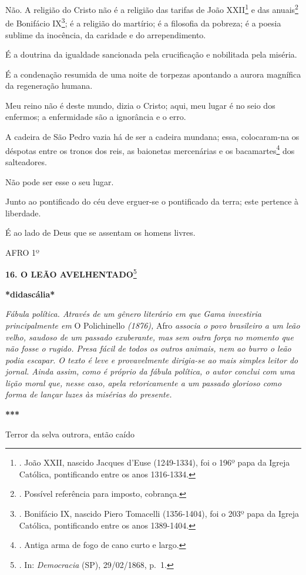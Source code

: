 Não. A religião do Cristo não é a religião das tarifas de João
XXII\footnote{. João XXII, nascido Jacques d'Euse (1249-1334), foi o
  196º papa da Igreja Católica, pontificando entre os anos 1316-1334.} e
das anuais\footnote{. Possível referência para imposto, cobrança.} de
Bonifácio IX\footnote{. Bonifácio IX, nascido Piero Tomacelli
  (1356-1404), foi o 203º papa da Igreja Católica, pontificando entre os
  anos 1389-1404.}; é a religião do martírio; é a filosofia da pobreza;
é a poesia sublime da inocência, da caridade e do arrependimento.

É a doutrina da igualdade sancionada pela crucificação e nobilitada pela
miséria.

É a condenação resumida de uma noite de torpezas apontando a aurora
magnífica da regeneração humana.

Meu reino não é deste mundo, dizia o Cristo; aqui, meu lugar é no seio
dos enfermos; a enfermidade são a ignorância e o erro.

A cadeira de São Pedro vazia há de ser a cadeira mundana; essa,
colocaram-na os déspotas entre os tronos dos reis, as baionetas
mercenárias e os bacamartes\footnote{. Antiga arma de fogo de cano curto
  e largo.} dos salteadores.

Não pode ser esse o seu lugar.

Junto ao pontificado do céu deve erguer-se o pontificado da terra; este
pertence à liberdade.

É ao lado de Deus que se assentam os homens livres.

AFRO 1º

\textbf{16. O LEÃO AVELHENTADO}\footnote{. In: \emph{Democracia} (SP),
  29/02/1868, p.~1.}

\textbf{*didascália*}

\emph{Fábula política. Através de um gênero literário em que Gama
investiria principalmente em} O Polichinello \emph{(1876),} Afro
\emph{associa o povo brasileiro a um leão velho, saudoso de um passado
exuberante, mas sem outra força no momento que não fosse o rugido. Presa
fácil de todos os outros animais, nem ao burro o leão podia escapar. O
texto é leve e provavelmente dirigia-se ao mais simples leitor do
jornal. Ainda assim, como é próprio da fábula política, o autor conclui
com uma lição moral que, nesse caso, apela retoricamente a um passado
glorioso como forma de lançar luzes às misérias do presente.}

\textbf{***}

Terror da selva outrora, então caído

